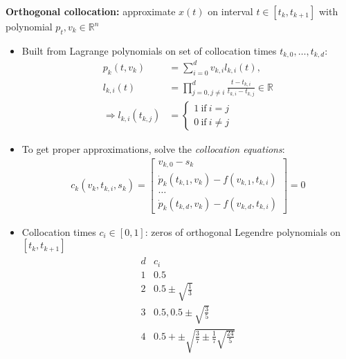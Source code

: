 \begin{tcolorbox}[colback=green!5!white,
  colframe=green!75!black,
  title=\textbf{Numerical integration/simulation}]
  \textbf{Orthogonal collocation:} approximate $x(t)$ on interval
  $t\in[t_k,t_{k+1}]$ with polynomial $p_t,v_k\in \mathbb{R}^n$
  \begin{itemize}
  \item Built from Lagrange polynomials on set of collocation times
    $t_{k,0},\dots,t_{k,d}$:
    \begin{align*}
      p_k(t,v_k)&=\sum^d_{i=0}v_{k,i}l_{k,i}(t),\\
      l_{k,i}(t)&=\prod^d_{j=0,j\ne i}\frac{t-t_{k,i}}{t_{k,i}-t_{k,j}}\in\mathbb{R} \\
      \Rightarrow l_{k,i}(t_{k,j})&=
                                    \left\{ 
                                    \begin{array}{l}
                                      1\ \mathrm{if}\ i=j \\
                                      0\ \mathrm{if}\ i\ne j
                                    \end{array}
      \right.
    \end{align*}
  \item To get proper approximations, solve the \emph{collocation equations}:
    \begin{align*}
      c_k(v_k,t_{k,i},s_k)=
      \left[
      \begin{array}{c}
        v_{k,0}-s_k \\
        \dot{p}_k(t_{k,1},v_k) - f(v_{k,1},t_{k,i}) \\
        \dots \\
        \dot{p}_k(t_{k,d},v_k)-f(v_{k,d},t_{k,i})
      \end{array}
      \right] = 0
    \end{align*}
  \item Collocation times $c_i\in [0,1]$: zeros of orthogonal Legendre
    polynomials on $[t_k,t_{k+1}]$
    \begin{align*}
      \begin{array}{cc}
        d & c_i \\ \hline
        1 & 0.5 \\
        2 & 0.5 \pm \sqrt{\frac{1}{3}} \\
        3 & 0.5, 0.5 \pm \sqrt{\frac{3}{5}} \\
        4 & 0.5 + \pm\sqrt{\frac{3}{7} \pm \frac{1}{7}\sqrt{\frac{24}{5}}}\\
      \end{array}
    \end{align*}
  \end{itemize}
\end{tcolorbox}
